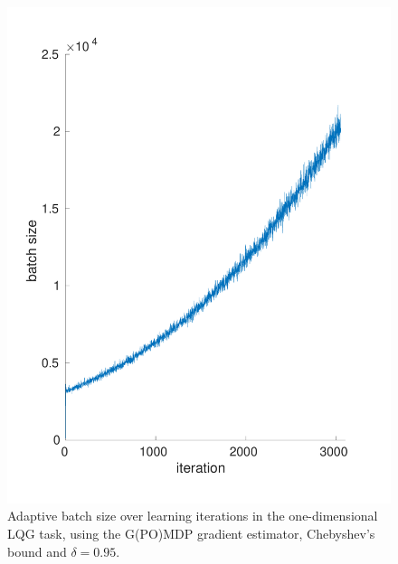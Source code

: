 \begin{figure}[h!]
\includegraphics[width = \textwidth]{Images/batchsize_cheb.pdf}
\caption[Adaptive batch size over learning iterations in the one-dimensional LQG task using Chebyshev's bound.]{Adaptive batch size over learning iterations in the one-dimensional \ac{LQG} task, using the G(PO)MDP gradient estimator, Chebyshev's bound and $\delta=0.95$.}
\label{fig:3}
\end{figure}


